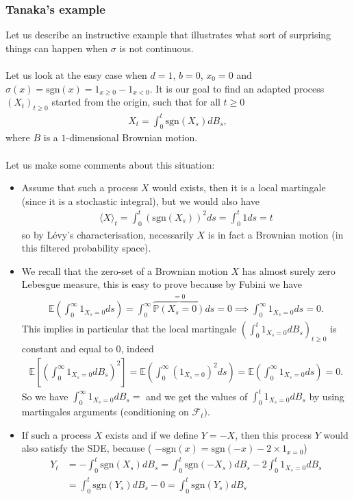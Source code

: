 \documentclass[../mainfile.tex]{subfiles}
\begin{document}
\subsubsection{Tanaka's example} Let us describe an instructive example that illustrates what sort of surprising things can happen when $\sigma$ is not continuous. \\
\\
Let us look at the easy case when $d=1$, $b=0$, $x_0=0$ and $\sigma(x)= \text{sgn}(x)=1_{x \geq 0}- 1_{x <0}$. It is our goal to find an adapted process $(X_t)_{t \geq 0}$ started from the origin, such that for all $t \geq 0$ \begin{align*}
X_t= \int_0^t \text{sgn}(X_s)dB_s,
\end{align*}
where $B$ is a $1$-dimensional Brownian motion. 
\\\\
Let us make some comments about this situation: 
\begin{itemize}
\item Assume that such a process $X$ would exists, then it is a local martingale (since it is a stochastic integral), but we would also have 
\begin{align*}
\langle X \rangle_t = \int_0^t ( \text{sgn}(X_s))^2 ds = \int_0^t 1 ds = t
\end{align*}
so by Lévy's characterisation, necessarily $X$ is in fact a Brownian motion (in this filtered probability space).
\item We recall that the zero-set of a Brownian motion $X$ has almost surely zero Lebesgue measure, this is easy to prove because by Fubini we have 
\begin{align*}
\mathbb{E} \left( \int_0^\infty 1_{X_s=0}ds \right) = \int_0^\infty \overbrace{\mathbb{P}(X_s=0)}^{=0}ds = 0 \implies \int_0^\infty 1_{X_s=0}ds =0.
\end{align*}
This implies in particular that the local martingale $( \int_0^t 1_{X_s=0} dB_s)_{t \geq 0}$ is constant and equal to $0$, indeed 
\begin{align*}
\mathbb{E}\left[ \left( \int_0^\infty 1_{X_s=0} dB_s\right)^2 \right] = \mathbb{E}\left( \int_0^\infty (1_{X_s=0})^2 ds \right) = \mathbb{E}\left( \int_0^\infty 1_{X_s=0} ds \right) =0.
\end{align*}
So we have $\int_0^\infty 1_{X_s=0} dB_s=$ and we get the values of $\int_0^t 1_{X_s=0} dB_s$ by using martingales arguments (conditioning on $\mathcal{F}_t)$. 
\item If such a process $X$ exists and if we define $Y=-X$, then this process $Y$ would also satisfy the SDE, because ( $- \text{sgn}(x)= \text{sgn}(-x)-2 \times 1_{x=0}$)
\begin{align*}
Y_t &= - \int_0^t \text{sgn}(X_s)dB_s =  \int_0^t \text{sgn}(-X_s)dB_s - 2 \int_0^t 1_{X_s=0} dB_s \\ &= \int_0^t \text{sgn}(Y_s)dB_s-0 = \int_0^t \text{sgn}(Y_s)dB_s
\end{align*}
\end{itemize}
\end{document}
